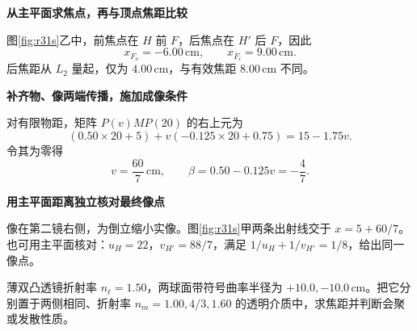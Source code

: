 \begin{solution}
\par\medskip{}\noindent\textbf{从主平面求焦点，再与顶点焦距比较}\par\nobreak
图\ref{fig:r31s}乙中，前焦点在 \(H\) 前 \(F\)，后焦点在 \(H'\) 后 \(F\)，因此
\[
 \boxed{x_{F_o}=-6.00\,\mathrm{cm},\qquad x_{F_i}=9.00\,\mathrm{cm}}.
\]
后焦距从 \(L_2\) 量起，仅为 \(4.00\,\mathrm{cm}\)，与有效焦距 \(8.00\,\mathrm{cm}\) 不同。


\par\medskip{}\noindent\textbf{补齐物、像两端传播，施加成像条件}\par\nobreak
对有限物距，矩阵 \(P(v)MP(20)\) 的右上元为
\[
 (0.50\times20+5)+v(-0.125\times20+0.75)
 =15-1.75v.
\]
令其为零得
\[
 \boxed{v=\frac{60}{7}\,\mathrm{cm}},\qquad
 \boxed{\beta=0.50-0.125v=-\frac47}.
\]


\par\medskip{}\noindent\textbf{用主平面距离独立核对最终像点}\par\nobreak
像在第二镜右侧，为倒立缩小实像。图\ref{fig:r31s}甲两条出射线交于 \(x=5+60/7\)。也可用主平面核对：\(u_H=22\)，\(v_{H'}=88/7\)，满足 \(1/u_H+1/v_{H'}=1/8\)，给出同一像点。
\end{solution}

\begin{question}
\begin{example}[凸透镜浸入液体后是否仍会聚]\label{ex:r32}
薄双凸透镜折射率 \(n_\ell=1.50\)，两球面带符号曲率半径为 \(+10.0,-10.0\,\mathrm{cm}\)。把它分别置于两侧相同、折射率 \(n_m=1.00,4/3,1.60\) 的透明介质中，求焦距并判断会聚或发散性质。
\end{example}
\end{question}

